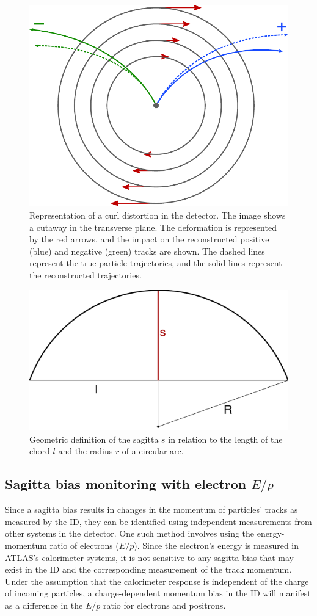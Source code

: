 \begin{figure}[htbp]
  \centering
  \includegraphics[width=.45\textwidth]{figs/alignment/radial-distortion}
  \caption{Representation of a curl distortion in the detector.  The image shows a cutaway in the transverse plane.  The deformation is represented by the red arrows, and the impact on the reconstructed positive (blue) and negative (green) tracks are shown.  The dashed lines represent the true particle trajectories, and the solid lines represent the reconstructed trajectories.}
  \label{fig:align_radial_distortion}
\end{figure}

\begin{figure}[htbp]
  \centering
  \includegraphics[width=.4\textwidth]{figs/alignment/sagitta}
  \caption{Geometric definition of the sagitta $s$ in relation to the length of the chord $l$ and the radius $r$ of a circular arc.}
  \label{fig:align_sagitta}
\end{figure}

\subsection{Sagitta bias monitoring with electron $E/p$}\label{align:eop}
Since a sagitta bias results in changes in the momentum of particles' tracks as measured by the ID, they can be identified using independent measurements from other systems in the detector.
One such method involves using the energy-momentum ratio of electrons ($E/p$).
Since the electron's energy is measured in ATLAS's calorimeter systems, it is not sensitive to any sagitta bias that may exist in the ID and the corresponding measurement of the track momentum.
Under the assumption that the calorimeter response is independent of the charge of incoming particles, a charge-dependent momentum bias in the ID will manifest as a difference in the $E/p$ ratio for electrons and positrons.%

